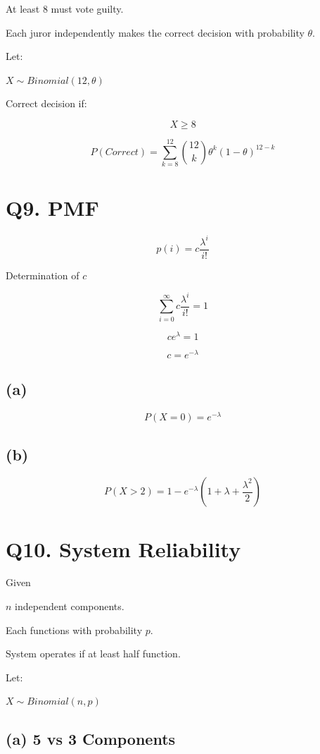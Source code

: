 \documentclass[11pt]{article}
\begin{document}
At least 8 must vote guilty.

Each juror independently makes the correct decision with probability $\theta$.

Let:

$X \sim Binomial(12,\theta)$

Correct decision if:

\[
X \ge 8
\]

\[
P(Correct)=\sum_{k=8}^{12} \binom{12}{k}\theta^k(1-\theta)^{12-k}
\]

\section*{\textbf{Q9. PMF}}

\[
p(i)=c\frac{\lambda^i}{i!}
\]

Determination of $c$

\[
\sum_{i=0}^{\infty} c\frac{\lambda^i}{i!}=1
\]

\[
ce^{\lambda}=1
\]

\[
c=e^{-\lambda}
\]

\subsection*{\textbf{(a)}}

\[
P(X=0)=e^{-\lambda}
\]

\subsection*{\textbf{(b)}}

\[
P(X>2)=1-e^{-\lambda}\left(1+\lambda+\frac{\lambda^2}{2}\right)
\]

\section*{\textbf{Q10. System Reliability}}

Given

$n$ independent components.

Each functions with probability $p$.

System operates if at least half function.

Let:

$X \sim Binomial(n,p)$

\subsection*{\textbf{(a) 5 vs 3 Components}}
\end{document}
